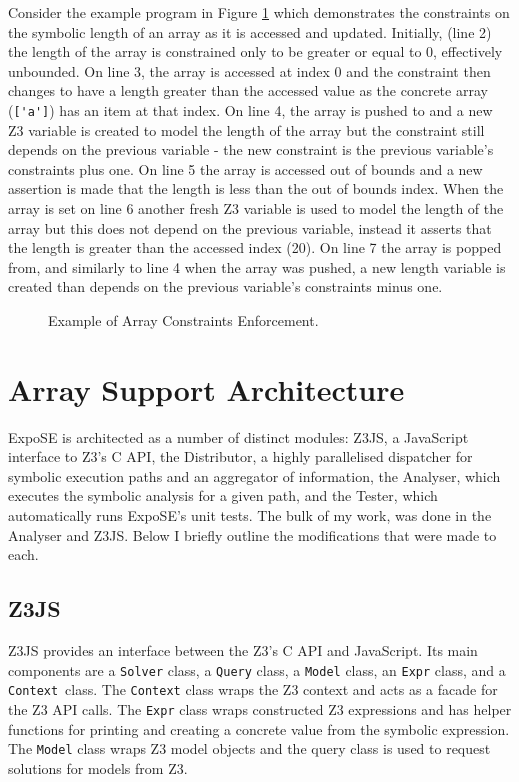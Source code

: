 \documentclass[]{final_report}
\begin{document}
Consider the example program in Figure \ref{fig:expose-array-length} which demonstrates the constraints on the symbolic length of an array as it is accessed and updated. Initially, (line 2) the length of the array is constrained only to be greater or equal to 0, effectively unbounded. On line 3, the array is accessed at index 0 and the constraint then changes to have a length greater than the accessed value as the concrete array (\lstinline|['a']|) has an item at that index. On line 4, the array is pushed to and a new Z3 variable is created to model the length of the array but the constraint still depends on the previous variable - the new constraint is the previous variable's constraints plus one. On line 5 the array is accessed out of bounds and a new assertion is made that the length is less than the out of bounds index. When the array is set on line 6 another fresh Z3 variable is used to model the length of the array but this does not depend on the previous variable, instead it asserts that the length is greater than the accessed index (20). On line 7 the array is popped from, and similarly to line 4 when the array was pushed, a new length variable is created than depends on the previous variable's constraints minus one.

\begin{figure}[t]

\caption{\label{fig:expose-array-length} Example of Array Constraints Enforcement.}
\end{figure}

\section{Array Support Architecture}
ExpoSE is architected as a number of distinct modules: Z3JS, a JavaScript interface to Z3's C API, the Distributor, a highly parallelised dispatcher for symbolic execution paths and an aggregator of information, the Analyser, which executes the symbolic analysis for a given path, and the Tester, which automatically runs ExpoSE's unit tests. The bulk of my work, was done in the Analyser and Z3JS. Below I briefly outline the modifications that were made to each.

\subsection{Z3JS}
Z3JS provides an interface between the Z3's C API and JavaScript. Its main components are a \lstinline|Solver| class, a \lstinline|Query| class, a \lstinline|Model| class, an \lstinline|Expr| class, and a \lstinline|Context|~class. The \lstinline|Context| class wraps the Z3 context and acts as a facade for the Z3 API calls. The \lstinline|Expr| class wraps constructed Z3 expressions and has helper functions for printing and creating a concrete value from the symbolic expression. The \lstinline|Model| class wraps Z3 model objects and the query class is used to request solutions for models from Z3.
\end{document}
